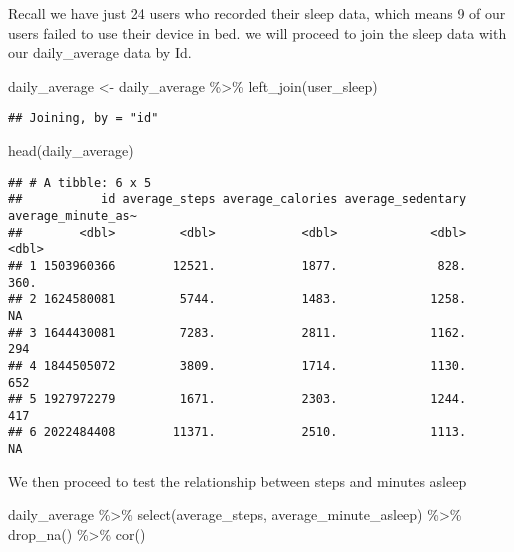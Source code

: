 \documentclass[
]{article}
\newenvironment{Shaded}{\begin{snugshade}}{\end{snugshade}}
\newcommand{\FunctionTok}[1]{\textcolor[rgb]{0.00,0.00,0.00}{#1}}
\newcommand{\NormalTok}[1]{#1}
\newcommand{\OtherTok}[1]{\textcolor[rgb]{0.56,0.35,0.01}{#1}}
\newcommand{\SpecialCharTok}[1]{\textcolor[rgb]{0.00,0.00,0.00}{#1}}
\begin{document}
Recall we have just 24 users who recorded their sleep data, which means
9 of our users failed to use their device in bed. we will proceed to
join the sleep data with our daily\_average data by Id.

\begin{Shaded}
\begin{Highlighting}[]
\NormalTok{daily\_average }\OtherTok{\textless{}{-}}\NormalTok{ daily\_average }\SpecialCharTok{\%\textgreater{}\%} 
  \FunctionTok{left\_join}\NormalTok{(user\_sleep)}
\end{Highlighting}
\end{Shaded}

\begin{verbatim}
## Joining, by = "id"
\end{verbatim}

\begin{Shaded}
\begin{Highlighting}[]
\FunctionTok{head}\NormalTok{(daily\_average)}
\end{Highlighting}
\end{Shaded}

\begin{verbatim}
## # A tibble: 6 x 5
##           id average_steps average_calories average_sedentary average_minute_as~
##        <dbl>         <dbl>            <dbl>             <dbl>              <dbl>
## 1 1503960366        12521.            1877.              828.               360.
## 2 1624580081         5744.            1483.             1258.                NA 
## 3 1644430081         7283.            2811.             1162.               294 
## 4 1844505072         3809.            1714.             1130.               652 
## 5 1927972279         1671.            2303.             1244.               417 
## 6 2022484408        11371.            2510.             1113.                NA
\end{verbatim}

We then proceed to test the relationship between steps and minutes
asleep

\begin{Shaded}
\begin{Highlighting}[]
\NormalTok{daily\_average }\SpecialCharTok{\%\textgreater{}\%} 
  \FunctionTok{select}\NormalTok{(average\_steps, average\_minute\_asleep) }\SpecialCharTok{\%\textgreater{}\%} 
  \FunctionTok{drop\_na}\NormalTok{() }\SpecialCharTok{\%\textgreater{}\%} 
  \FunctionTok{cor}\NormalTok{()}
\end{Highlighting}
\end{Shaded}
\end{document}
